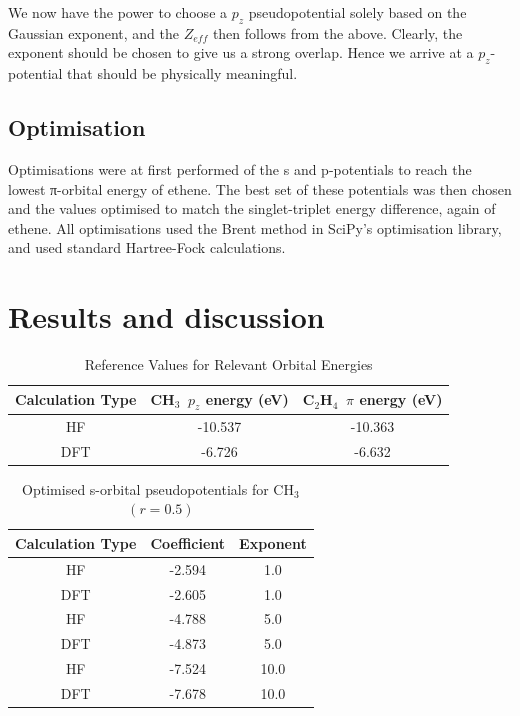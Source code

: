\documentclass[journal=jctcce,manuscript=article]{achemso}
\begin{document}
We now have the power to choose a \(p_{z}\) pseudopotential solely based on the Gaussian exponent, and the \(Z_{eff}\) then follows from the above. Clearly, the exponent should be chosen to give us a strong overlap. Hence we arrive at a \(p_{z}\)-potential that should be physically meaningful. 

\subsection{Optimisation}

Optimisations were at first performed of the s and p-potentials to reach the lowest π-orbital energy of ethene. The best set of these potentials was then chosen and the values optimised to match the singlet-triplet energy difference, again of ethene. All optimisations used the Brent method in SciPy's optimisation library, and used standard Hartree-Fock calculations.

\section{Results and discussion}

\begin{table}[ht]
\caption{Reference Values for Relevant Orbital Energies} 
\centering
\begin{tabular}{c c c}
\hline\hline
Calculation Type & CH\(_{3}\)\, \(p_{z}\) energy (eV) & C\(_{2}\)H\(_{4}\)\, \(\pi\) energy (eV) \\
\hline
HF & -10.537 & -10.363 \\
DFT & -6.726 & -6.632 \\
\hline
\end{tabular}
\label{table:ref_values} %
\end{table}

\begin{table}[ht]
\caption{Optimised s-orbital pseudopotentials for CH\(_{3}\) \((r = 0.5)\)}
\begin{tabular}{c c c}
\hline\hline
Calculation Type & Coefficient & Exponent \\ [0.5ex]
\hline
HF & -2.594 & 1.0 \\
DFT & -2.605 & 1.0 \\
\hline
HF & -4.788 & 5.0 \\
DFT & -4.873 & 5.0 \\
\hline
HF & -7.524 & 10.0 \\
DFT & -7.678 & 10.0 \\
\hline
\end{tabular}
\end{table}
\end{document}
